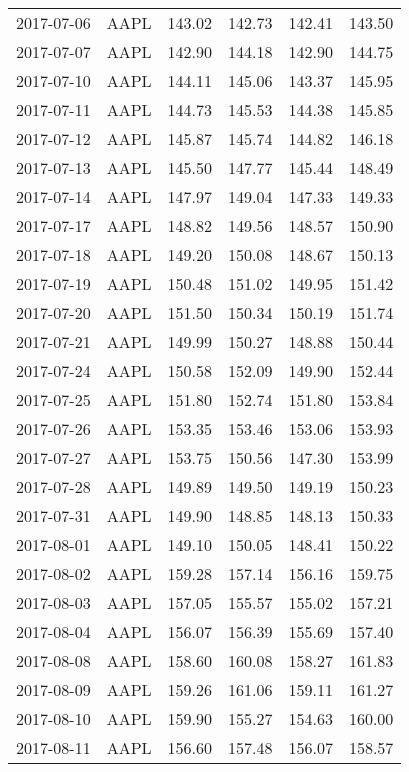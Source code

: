 \documentclass[12pt,a4paper]{report}
\begin{document}
\begin{appendices}
\begin{longtable}{llllll}
  2017-07-06 & AAPL & 143.02 & 142.73 & 142.41 & 143.50 \\ 
  2017-07-07 & AAPL & 142.90 & 144.18 & 142.90 & 144.75 \\ 
  2017-07-10 & AAPL & 144.11 & 145.06 & 143.37 & 145.95 \\ 
  2017-07-11 & AAPL & 144.73 & 145.53 & 144.38 & 145.85 \\ 
  2017-07-12 & AAPL & 145.87 & 145.74 & 144.82 & 146.18 \\ 
  2017-07-13 & AAPL & 145.50 & 147.77 & 145.44 & 148.49 \\ 
  2017-07-14 & AAPL & 147.97 & 149.04 & 147.33 & 149.33 \\ 
  2017-07-17 & AAPL & 148.82 & 149.56 & 148.57 & 150.90 \\ 
  2017-07-18 & AAPL & 149.20 & 150.08 & 148.67 & 150.13 \\ 
  2017-07-19 & AAPL & 150.48 & 151.02 & 149.95 & 151.42 \\ 
  2017-07-20 & AAPL & 151.50 & 150.34 & 150.19 & 151.74 \\ 
  2017-07-21 & AAPL & 149.99 & 150.27 & 148.88 & 150.44 \\ 
  2017-07-24 & AAPL & 150.58 & 152.09 & 149.90 & 152.44 \\ 
  2017-07-25 & AAPL & 151.80 & 152.74 & 151.80 & 153.84 \\ 
  2017-07-26 & AAPL & 153.35 & 153.46 & 153.06 & 153.93 \\ 
  2017-07-27 & AAPL & 153.75 & 150.56 & 147.30 & 153.99 \\ 
  2017-07-28 & AAPL & 149.89 & 149.50 & 149.19 & 150.23 \\ 
  2017-07-31 & AAPL & 149.90 & 148.85 & 148.13 & 150.33 \\ 
  2017-08-01 & AAPL & 149.10 & 150.05 & 148.41 & 150.22 \\ 
  2017-08-02 & AAPL & 159.28 & 157.14 & 156.16 & 159.75 \\ 
  2017-08-03 & AAPL & 157.05 & 155.57 & 155.02 & 157.21 \\ 
  2017-08-04 & AAPL & 156.07 & 156.39 & 155.69 & 157.40 \\ 
  2017-08-08 & AAPL & 158.60 & 160.08 & 158.27 & 161.83 \\ 
  2017-08-09 & AAPL & 159.26 & 161.06 & 159.11 & 161.27 \\ 
  2017-08-10 & AAPL & 159.90 & 155.27 & 154.63 & 160.00 \\ 
  2017-08-11 & AAPL & 156.60 & 157.48 & 156.07 & 158.57 \\ 

\end{longtable}
\end{appendices}
\end{document}
